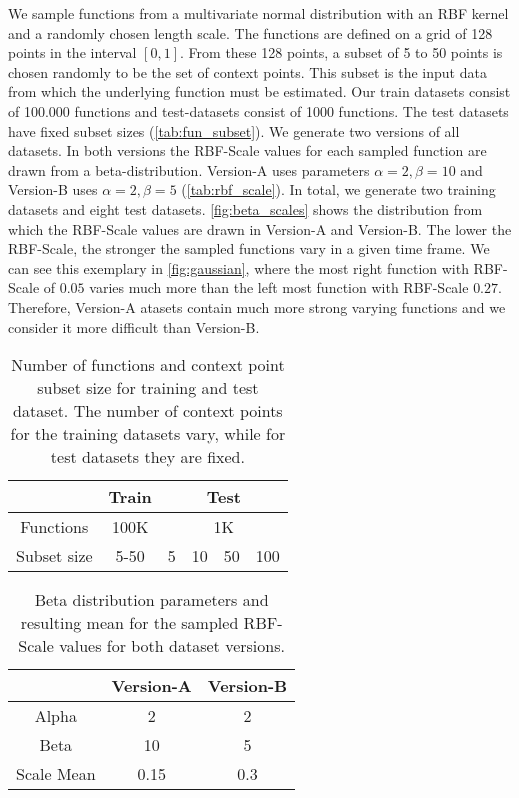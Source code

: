 We sample functions from a multivariate normal distribution with an RBF kernel and a randomly chosen length scale. The functions are defined on a grid of 128 points in the interval $[0,1]$. From these 128 points, a subset of 5 to 50 points is chosen randomly to be the set of context points. This subset is the input data from which the underlying function must be estimated. Our train datasets consist of 100.000 functions and test-datasets consist of 1000 functions. The test datasets have fixed subset sizes (\autoref{tab:fun_subset}). We generate two versions of all datasets. In both versions the RBF-Scale values for each sampled function are drawn from a beta-distribution. Version-A uses parameters $\alpha = 2, \beta = 10$ and Version-B uses $\alpha = 2, \beta = 5$ (\autoref{tab:rbf_scale}). In total, we generate two training datasets and eight test datasets. \autoref{fig:beta_scales} shows the distribution from which the RBF-Scale values are drawn in Version-A and Version-B. The lower the RBF-Scale, the stronger the sampled functions vary in a given time frame. We can see this exemplary in \autoref{fig:gaussian}, where the most right function with RBF-Scale of $0.05$ varies much more than the left most function with RBF-Scale $0.27$. Therefore, Version-A atasets contain much more strong varying functions and we consider it more difficult than Version-B.

\begin{table}[]
	\centering
	\caption{Number of functions and context point subset size for training and test dataset. The number of context points for the training datasets vary, while for test datasets they are fixed.}
	\begin{tabular}{c c c c c c}
		\toprule
		& Train & \multicolumn{4}{c}{Test}\\
		\midrule
		Functions & 100K & \multicolumn{4}{c}{1K}\\
		Subset size & 5-50 & 5 & 10 & 50 & 100  \\\bottomrule
	\end{tabular}
	\label{tab:fun_subset}
\end{table}

\begin{table}[]
	\centering
	\caption{Beta distribution parameters and resulting mean for the sampled RBF-Scale values for both dataset versions.}
	\begin{tabular}{c c c}
		\toprule
		& Version-A & Version-B\\
		\midrule
		Alpha & 2 & 2\\
		Beta & 10 & 5  \\\midrule
		Scale Mean & 0.15 & 0.3\\\bottomrule
	\end{tabular}
	\label{tab:rbf_scale}
\end{table}


